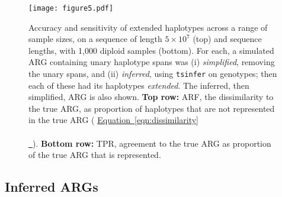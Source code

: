 \documentclass[10pt,twoside,lineno]{gsajnl}
\newcommand{\tsinfer}{\texttt{tsinfer}}
\newcommand*{\eqnref}[2][]{%
	\hyperref[{#2}]{%
		Equation~\ref*{#2}%
		\ifx\\#1\\%
		\else
		\,#1%
		\fi
	}%
}
\begin{document}
\begin{figure}[!hbt]
	\begin{center}
        \texttt{[image: figure5.pdf]}
	\end{center}
    \caption{
        Accuracy and sensitivity of extended haplotypes
        across a range of sample sizes, on a sequence of length $5\times10^7$ (top)
        and sequence lengths, with 1,000 diploid samples (bottom).
        For each, a simulated ARG containing unary haplotype spans
        was (i) \emph{simplified}, removing the unary spans,
        and (ii) \emph{inferred}, using \tsinfer{} on genotypes;
        then each of these had its haplotypes \emph{extended}.
        The inferred, then simplified, ARG is also shown.
        \textbf{Top row:} ARF, the dissimilarity to the true ARG,
        as proportion of haplotypes that are not represented in the true ARG
        (\eqnref{eqn:dissimilarity}).
        \textbf{Bottom row:} TPR, agreement to the true ARG
        as proportion of the true ARG that is represented.
        }     
    \label{fig:dissimilarity}
\end{figure}


\subsection{Inferred ARGs}
\end{document}
